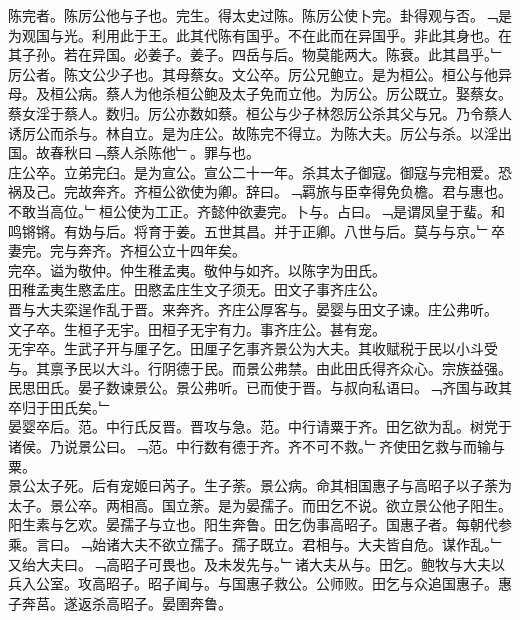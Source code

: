 \documentclass{zhvt-classic}
\begin{document}
\hspace*{2em}陈完者。陈厉公他与子也。完生。得太史过陈。陈厉公使卜完。卦得观与否。﹁是为观国与光。利用此于王。此其代陈有国乎。不在此而在异国乎。非此其身也。在其子孙。若在异国。必姜子。姜子。四岳与后。物莫能两大。陈衰。此其昌乎。﹂\\
\hspace*{2em}厉公者。陈文公少子也。其母蔡女。文公卒。厉公兄鲍立。是为桓公。桓公与他异母。及桓公病。蔡人为他杀桓公鲍及太子免而立他。为厉公。厉公既立。娶蔡女。蔡女淫于蔡人。数归。厉公亦数如蔡。桓公与少子林怨厉公杀其父与兄。乃令蔡人诱厉公而杀与。林自立。是为庄公。故陈完不得立。为陈大夫。厉公与杀。以淫出国。故春秋曰﹁蔡人杀陈他﹂。罪与也。\\
\hspace*{2em}庄公卒。立弟完臼。是为宣公。宣公二十一年。杀其太子御寇。御寇与完相爱。恐祸及己。完故奔齐。齐桓公欲使为卿。辞曰。﹁羁旅与臣幸得免负檐。君与惠也。不敢当高位。﹂桓公使为工正。齐懿仲欲妻完。卜与。占曰。﹁是谓凤皇于蜚。和鸣锵锵。有妫与后。将育于姜。五世其昌。并于正卿。八世与后。莫与与京。﹂卒妻完。完与奔齐。齐桓公立十四年矣。\\
\hspace*{2em}完卒。谥为敬仲。仲生稚孟夷。敬仲与如齐。以陈字为田氏。\\
\hspace*{2em}田稚孟夷生愍孟庄。田愍孟庄生文子须无。田文子事齐庄公。\\
\hspace*{2em}晋与大夫栾逞作乱于晋。来奔齐。齐庄公厚客与。晏婴与田文子谏。庄公弗听。\\
\hspace*{2em}文子卒。生桓子无宇。田桓子无宇有力。事齐庄公。甚有宠。\\
\hspace*{2em}无宇卒。生武子开与厘子乞。田厘子乞事齐景公为大夫。其收赋税于民以小斗受与。其禀予民以大斗。行阴德于民。而景公弗禁。由此田氏得齐众心。宗族益强。民思田氏。晏子数谏景公。景公弗听。已而使于晋。与叔向私语曰。﹁齐国与政其卒归于田氏矣。﹂\\
\hspace*{2em}晏婴卒后。范。中行氏反晋。晋攻与急。范。中行请粟于齐。田乞欲为乱。树党于诸侯。乃说景公曰。﹁范。中行数有德于齐。齐不可不救。﹂齐使田乞救与而输与粟。\\
\hspace*{2em}景公太子死。后有宠姬曰芮子。生子荼。景公病。命其相国惠子与高昭子以子荼为太子。景公卒。两相高。国立荼。是为晏孺子。而田乞不说。欲立景公他子阳生。阳生素与乞欢。晏孺子与立也。阳生奔鲁。田乞伪事高昭子。国惠子者。每朝代参乘。言曰。﹁始诸大夫不欲立孺子。孺子既立。君相与。大夫皆自危。谋作乱。﹂又绐大夫曰。﹁高昭子可畏也。及未发先与。﹂诸大夫从与。田乞。鲍牧与大夫以兵入公室。攻高昭子。昭子闻与。与国惠子救公。公师败。田乞与众追国惠子。惠子奔莒。遂返杀高昭子。晏圉奔鲁。\\
\end{document}
